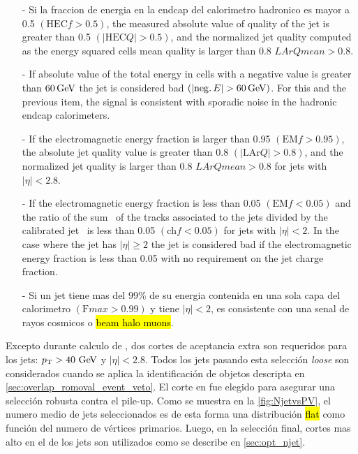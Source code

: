 \begin{itemize}\itemsep0.1cm
\item[-] Si la fraccion de energia en la endcap del calorimetro hadronico
  es mayor a 0.5 $\left(\mathrm{HEC}f > 0.5\right)$, the measured absolute
  value of quality of the jet is greater than 0.5 $\left(|\mathrm{HEC}Q| > 0.5\right)$,
  and the normalized jet quality computed as the energy squared cells mean
  quality is larger than 0.8 $LArQmean > 0.8$.
\item[-] If absolute value of the total energy in cells with a negative value
  is greater than $\unit[60]{GeV}$ the jet is considered bad
  $\left(|\mathrm{neg.}\,E| > \unit[60]{GeV}\right)$.
  For this and the previous item, the signal is consistent with sporadic
  noise in the hadronic endcap calorimeters.
\item[-] If the electromagnetic energy fraction is larger than 0.95
  $\left(\mathrm{EM}f > 0.95\right)$, the absolute jet quality value is greater than
  0.8 $\left(|\mathrm{LAr}Q| > 0.8\right)$, and the normalized jet quality is larger than 0.8
 $LArQmean > 0.8$ for jets with $|\eta| < 2.8$.
\item[-] If the electromagnetic energy fraction is less than 0.05
  $\left(\mathrm{EM}f < 0.05\right)$ and the ratio of the sum \pt\ of the
  tracks associated to the jets divided by the calibrated jet \pt\ is less than 0.05
  $\left(\mathrm{ch}f < 0.05\right)$ for jets with $|\eta| < 2$.
  In the case where the jet has $|\eta| \ge 2$ the jet is considered bad if
  the electromagnetic energy fraction is less than 0.05 with no requirement on
  the jet charge fraction.
\item[-] Si un jet tiene mas del $99\%$ de su energia contenida en una sola capa
  del calorimetro $(\mathrm{F}max > 0.99)$ y tiene $|\eta| < 2$, es consistente
  con una senal de rayos cosmicos o \hl{beam halo muons}.
\end{itemize}

Excepto durante calculo de {\met}, dos cortes de aceptancia extra son requeridos
para los jets: $\pt > 40 \gev$ y $|\eta| < 2.8$.
Todos los jets pasando esta selección \emph{loose} son considerados cuando se aplica
la identificación de objetos descripta en \cref{sec:overlap_romoval_event_veto}.
El corte en {\pt} fue elegido para asegurar una selección robusta contra el pile-up.
Como se muestra en la \cref{fig:NjetvsPV}, el numero medio de jets seleccionados
es de esta forma una distribución \hl{flat} como función del numero de vértices
primarios. Luego, en la selección final, cortes mas alto en el {\pt} de los jets
son utilizados como se describe en \cref{sec:opt_njet}.

